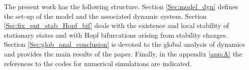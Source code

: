 The present work has the following structure. Section \ref{Sec:model_dyn} defines the set-up of the model and the associated dynamic system. Section \ref{Sec:fix_pnt_stab_Hopf_bif} deals with the existence and local stability of stationary states and with Hopf bifurcations arising from stability changes. Section \ref{Sec:glob_anal_conclusion} is devoted to the global analysis of dynamics and provides the main results of the paper. Finally, in the appendix \ref{app:A} the references to the codes for numerical simulations are indicated.

